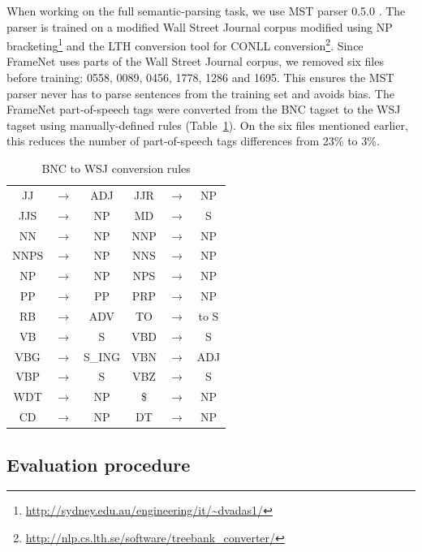 When working on the full semantic-parsing task, we use MST parser 0.5.0
\citep{mcdonald2006multilingual}. The parser is trained on a modified Wall
Street Journal corpus modified using NP
bracketing\footnote{\url{http://sydney.edu.au/engineering/it/~dvadas1/}} and
the LTH conversion tool for CONLL
conversion\footnote{\url{http://nlp.cs.lth.se/software/treebank_converter/}}.
Since FrameNet uses parts of the Wall Street Journal corpus, we removed six
files before training: 0558, 0089, 0456, 1778, 1286 and 1695. This ensures the
MST parser never has to parse sentences from the training set and avoids bias.
The FrameNet part-of-speech tags were converted from the BNC tagset to the WSJ
tagset using manually-defined rules (Table~\ref{table:tagset_rules}). On the
six files mentioned earlier, this reduces the number of part-of-speech tags
differences from 23\% to 3\%.

\begin{table}[hb]
    \centering
    \begin{tabular}{ccc|ccc}
        \toprule
        JJ   &$\to$& ADJ    & JJR  &$\to$& NP     \\
        JJS  &$\to$& NP     & MD   &$\to$& S      \\
        NN   &$\to$& NP     & NNP  &$\to$& NP     \\
        NNPS &$\to$& NP     & NNS  &$\to$& NP     \\
        NP   &$\to$& NP     & NPS  &$\to$& NP     \\
        PP   &$\to$& PP     & PRP  &$\to$& NP     \\  
        RB   &$\to$& ADV    & TO   &$\to$& to S   \\
        VB   &$\to$& S      & VBD  &$\to$& S      \\
        VBG  &$\to$& S\_ING & VBN  &$\to$& ADJ    \\
        VBP  &$\to$& S      & VBZ  &$\to$& S      \\
        WDT  &$\to$& NP     & \$   &$\to$& NP     \\  
        CD   &$\to$& NP     & DT   &$\to$& NP     \\
        \bottomrule
    \end{tabular}
    \caption{\protect\centering\label{table:tagset_rules}BNC to WSJ conversion rules}
\end{table}


\subsection{Evaluation procedure}

